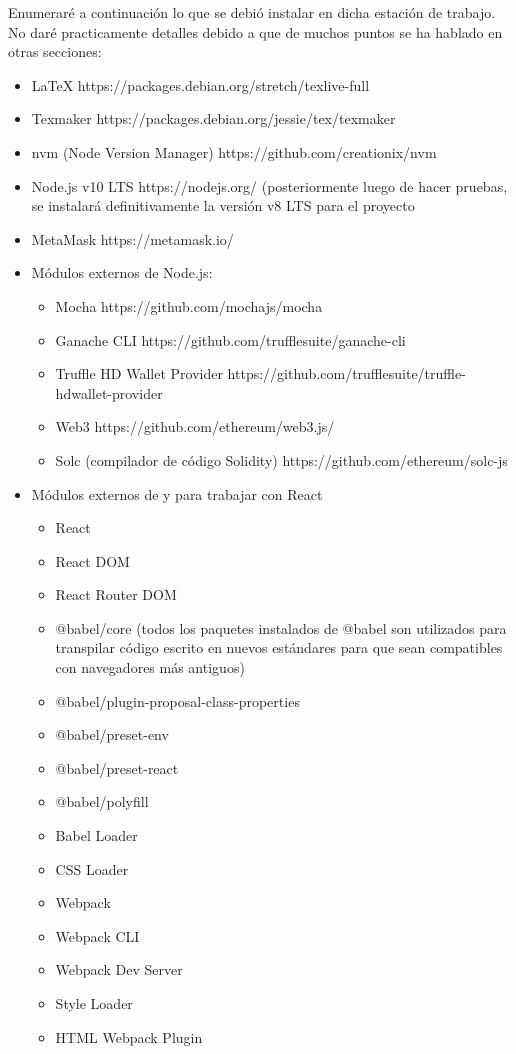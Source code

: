 Enumeraré a continuación lo que se debió instalar en dicha estación de trabajo. No daré
practicamente detalles debido a que de muchos puntos se ha hablado en otras secciones:

\begin{itemize}
\item LaTeX https://packages.debian.org/stretch/texlive-full
\item Texmaker https://packages.debian.org/jessie/tex/texmaker
\item nvm (Node Version Manager) https://github.com/creationix/nvm
\item Node.js v10 LTS https://nodejs.org/ (posteriormente luego de hacer pruebas, se instalará definitivamente la versión v8 LTS para el proyecto
\item MetaMask https://metamask.io/
\item Módulos externos de Node.js:
	\begin{itemize}
		\item Mocha https://github.com/mochajs/mocha
		\item Ganache CLI https://github.com/trufflesuite/ganache-cli
		\item Truffle HD Wallet Provider https://github.com/trufflesuite/truffle-hdwallet-provider
		\item Web3 https://github.com/ethereum/web3.js/
		\item Solc (compilador de código Solidity) https://github.com/ethereum/solc-js
	\end{itemize}
\item Módulos externos de y para trabajar con React
	\begin{itemize}
		\item React
		\item React DOM
		\item React Router DOM
		\item @babel/core (todos los paquetes instalados de @babel son utilizados para transpilar código escrito en nuevos estándares para que sean compatibles con navegadores más antiguos)
		\item @babel/plugin-proposal-class-properties
		\item @babel/preset-env
		\item @babel/preset-react
		\item @babel/polyfill
		\item Babel Loader
		\item CSS Loader
		\item Webpack
		\item Webpack CLI
		\item Webpack Dev Server
		\item Style Loader
		\item HTML Webpack Plugin
	\end{itemize} 
\end{itemize}

